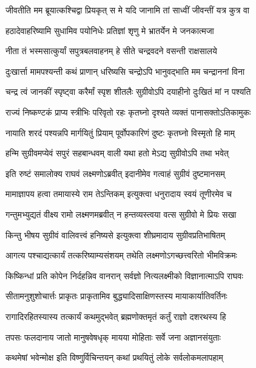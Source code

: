 \twolineshloka
{जीवतीति मम ब्रूयात्कश्चिद्वा प्रियकृत् स मे}
{यदि जानामि तां साध्वीं जीवन्तीं यत्र कुत्र वा} %

\twolineshloka
{हठादेवाहरिष्यामि सुधामिव पयोनिधेः}
{प्रतिज्ञां शृणु मे भ्रातर्येन मे जनकात्मजा} %

\twolineshloka
{नीता तं भस्मसात्कुर्यां सपुत्रबलवाहनम्}
{हे सीते चन्द्रवदने वसन्ती राक्षसालये} %

\twolineshloka
{दुःखार्त्ता मामपश्यन्ती कथं प्राणान् धरिष्यसि}
{चन्द्रोऽपि भानुवद्भाति मम चन्द्राननां विना} %

\twolineshloka
{चन्द्र त्वं जानकीं स्पृष्ट्वा करैर्मां स्पृश शीतलैः}
{सुग्रीवोऽपि दयाहीनो दुःखितं मां न पश्यति} %

\twolineshloka
{राज्यं निष्कण्टकं प्राप्य स्त्रीभिः परिवृतो रहः}
{कृतघ्नो दृश्यते व्यक्तं पानासक्तोऽतिकामुकः} %

\twolineshloka
{नायाति शरदं पश्यन्नपि मार्गयितुं प्रियाम्}
{पूर्वोपकारिणं दुष्टः कृतघ्नो विस्मृतो हि माम्} %

\twolineshloka
{हन्मि सुग्रीवमप्येवं सपुरं सहबान्धवम्}
{वाली यथा हतो मेऽद्य सुग्रीवोऽपि तथा भवेत्} %

\twolineshloka
{इति रुष्टं समालोक्य राघवं लक्ष्मणोऽब्रवीत्}
{इदानीमेव गत्वाहं सुग्रीवं दुष्टमानसम्} %

\twolineshloka
{मामाज्ञापय हत्वा तमायास्ये राम तेऽन्तिकम्}
{इत्युक्त्वा धनुरादाय स्वयं तूणीरमेव च} %

\twolineshloka
{गन्तुमभ्युद्यतं वीक्ष्य रामो लक्ष्मणमब्रवीत्}
{न हन्तव्यस्त्वया वत्स सुग्रीवो मे प्रियः सखा} %

\twolineshloka
{किन्तु भीषय सुग्रीवं वालिवत्त्वं हनिष्यसे}
{इत्युक्त्वा शीघ्रमादाय सुग्रीवप्रतिभाषितम्} %

\twolineshloka
{आगत्य पश्चाद्यत्कार्यं तत्करिष्याम्यसंशयम्}
{तथेति लक्ष्मणोऽगच्छत्त्वरितो भीमविक्रमः} %

\twolineshloka
{किष्किन्धां प्रति कोपेन निर्दहन्निव वानरान्}
{सर्वज्ञो नित्यलक्ष्मीको विज्ञानात्माऽपि राघवः} %

\twolineshloka
{सीतामनुशुशोचार्त्तः प्राकृतः प्राकृतामिव}
{बुद्ध्यादिसाक्षिणस्तस्य मायाकार्यातिवर्तिनः} %

\twolineshloka
{रागादिरहितस्यास्य तत्कार्यं कथमुद्भवेत्}
{ब्रह्मणोक्तमृतं कर्तुं राज्ञो दशरथस्य हि} %

\twolineshloka
{तपसः फलदानाय जातो मानुषवेषधृक्}
{मायया मोहिताः सर्वे जना अज्ञानसंयुताः} %

\twolineshloka
{कथमेषां भवेन्मोक्ष इति विष्णुर्विचिन्तयन्}
{कथां प्रथयितुं लोके सर्वलोकमलापहाम्} %

